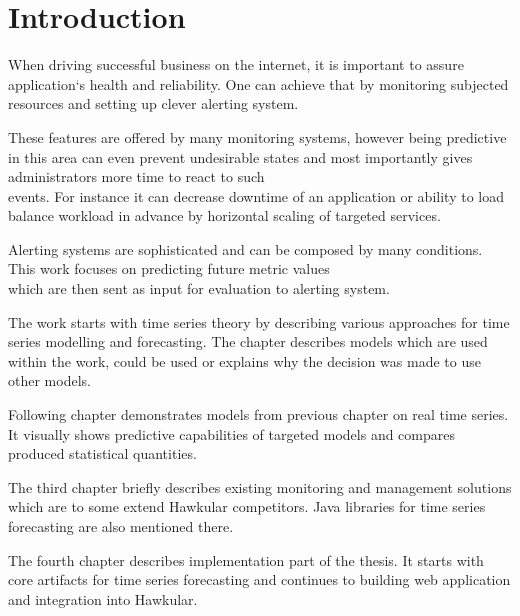 
%
%
%
\chapter{Introduction} \label{chap:introduction}
When driving successful business on the internet, it is important to assure application`s health and reliability. One
can achieve that by monitoring subjected resources and setting up clever alerting system.

These features are offered by many monitoring systems, however being predictive in this area can even prevent
undesirable states and most importantly gives administrators more time to react to such \\events. For instance it
can decrease downtime of an application or ability to load balance workload in advance by horizontal scaling of
targeted services.

Alerting systems are sophisticated and can be composed by many conditions. This work focuses on predicting future
metric values \\which are then sent as input for evaluation to alerting system.

The work starts with time series theory by describing various approaches for time series modelling and forecasting.
The chapter describes models which are used within the work, could be used or explains why the decision was made to
use other models.

Following chapter demonstrates models from previous chapter on real time series. It visually shows predictive
capabilities of targeted models and compares produced statistical quantities.

The third chapter briefly describes existing monitoring and management solutions which are to some extend
Hawkular competitors. Java libraries for time series forecasting are also mentioned there.

The fourth chapter describes implementation part of the thesis. It starts with core artifacts for time series
forecasting and continues to building web application and integration into Hawkular.

